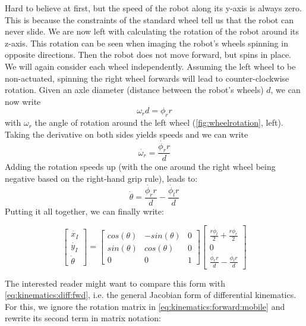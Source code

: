 Hard to believe at first, but the speed of the robot along its y-axis is always zero. This is because the constraints of the standard wheel tell us that the robot can never slide.
We are now left with calculating the rotation of the robot around its z-axis. This rotation can be seen when imaging the robot's wheels spinning in opposite directions. Then the robot does not move forward, but spins in place.
We will again consider each wheel independently. Assuming the left wheel to be non-actuated, spinning the right wheel forwards will lead to counter-clockwise rotation. Given an axle diameter (distance between the robot's wheels) $d$, we can now write
\begin{equation}
\omega_r d = \phi_r r
\end{equation}
with $\omega_r$ the angle of rotation around the left wheel (\cref{fig:wheelrotation}, left). Taking the derivative on both sides yields speeds and we can write
\begin{equation}
\dot{\omega_r} = \frac{\dot{\phi_r} r}{d}
\end{equation}
Adding the rotation speeds up (with the one around the right wheel being negative based on the right-hand grip rule), leads to:
%
\begin{equation}
\dot{\theta}=\frac{\dot{\phi_r} r}{d}-\frac{\dot{\phi_l} r}{d}
\end{equation}
%
Putting it all together, we can finally write:

\begin{equation}\label{eq:kinematics:forward:mobile}
\left[\begin{array}{c} \dot{x_I}\\\dot{y_I}\\\dot{\theta}\end{array}\right]=\left[\begin{array}{ccc}
cos(\theta) & -sin(\theta) & 0 \\
sin(\theta) & cos(\theta) & 0 \\
0 & 0 & 1\end{array}\right]\left[\begin{array}{c}\frac{r\dot{\phi_l}}{2}+\frac{r\dot{\phi_r}}{2}\\0\\\frac{\dot{\phi_r} r}{d}-\frac{\dot{\phi_l} r}{d}\end{array}\right]
\end{equation}

The interested reader might want to compare this form with \cref{eq:kinematics:diff:fwd}, i.e. the general Jacobian form of differential kinematics. For this, we ignore the rotation matrix in \cref{eq:kinematics:forward:mobile} and rewrite its second term in matrix notation:

